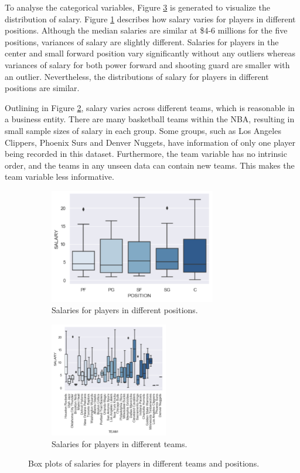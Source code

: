 \documentclass[letterpaper,12pt,twoside,]{pinp}
\begin{document}
To analyse the categorical variables, Figure \ref{fig:boxes} is
generated to visualize the distribution of salary. Figure
\ref{fig:position} describes how salary varies for players in different
positions. Although the median salaries are similar at \$4-6 millions
for the five positions, variances of salary are slightly different.
Salaries for players in the center and small forward position vary
significantly without any outliers whereas variances of salary for both
power forward and shooting guard are smaller with an outlier.
Nevertheless, the distributions of salary for players in different
positions are similar.

Outlining in Figure \ref{fig:team}, salary varies across different
teams, which is reasonable in a business entity. There are many
basketball teams within the NBA, resulting in small sample sizes of
salary in each group. Some groups, such as Los Angeles Clippers, Phoenix
Surs and Denver Nuggets, have information of only one player being
recorded in this dataset. Furthermore, the team variable has no
intrinsic order, and the teams in any unseen data can contain new teams.
This makes the team variable less informative.

\begin{figure}[H]
\begin{subfigure}{0.5\textwidth}
\includegraphics[width=0.9\linewidth, height=5cm]{position_box.png}
\centering
\caption{Salaries for players in different positions.}
\label{fig:position}
\end{subfigure}
\begin{subfigure}{0.5\textwidth}
\includegraphics[width=0.9\linewidth, height=5cm]{team_box.png}
\centering
\caption{Salaries for players in different teams.}
\label{fig:team}
\end{subfigure}
\caption{Box plots of salaries for players in different teams and positions.}
\label{fig:boxes}
\end{figure}
\end{document}
